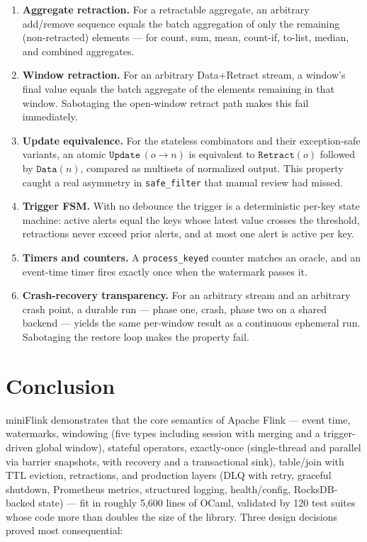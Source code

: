 \documentclass[11pt,a4paper]{article}
\begin{document}
\begin{enumerate}
\item \textbf{Aggregate retraction.} For a retractable aggregate, an
  arbitrary add/remove sequence equals the batch aggregation of only
  the remaining (non-retracted) elements --- for count, sum, mean,
  count-if, to-list, median, and combined aggregates.
\item \textbf{Window retraction.} For an arbitrary Data+Retract
  stream, a window's final value equals the batch aggregate of the
  elements remaining in that window. Sabotaging the open-window
  retract path makes this fail immediately.
\item \textbf{Update equivalence.} For the stateless combinators and
  their exception-safe variants, an atomic $\mathtt{Update}\,(o
  \to n)$ is equivalent to $\mathtt{Retract}(o)$ followed by
  $\mathtt{Data}(n)$, compared as multisets of normalized output. This
  property caught a real asymmetry in \texttt{safe\_filter} that
  manual review had missed.
\item \textbf{Trigger FSM.} With no debounce the trigger is a
  deterministic per-key state machine: active alerts equal the keys
  whose latest value crosses the threshold, retractions never exceed
  prior alerts, and at most one alert is active per key.
\item \textbf{Timers and counters.} A \texttt{process\_keyed} counter
  matches an oracle, and an event-time timer fires exactly once when
  the watermark passes it.
\item \textbf{Crash-recovery transparency.} For an arbitrary stream
  and an arbitrary crash point, a durable run --- phase one, crash,
  phase two on a shared backend --- yields the same per-window result
  as a continuous ephemeral run. Sabotaging the restore loop makes the
  property fail.
\end{enumerate}

\section{Conclusion}

miniFlink demonstrates that the core semantics of Apache Flink —
event time, watermarks, windowing (five types including session with
merging and a trigger-driven global window), stateful operators,
exactly-once (single-thread and parallel via barrier snapshots, with
recovery and a transactional sink), table/join with TTL eviction,
retractions, and production layers (DLQ with retry, graceful shutdown,
Prometheus metrics, structured logging, health/config, RocksDB-backed
state) --- fit in roughly 5{,}600 lines of OCaml, validated by 120 test
suites whose code more than doubles the size of the library. Three
design decisions proved most consequential:
\end{document}
